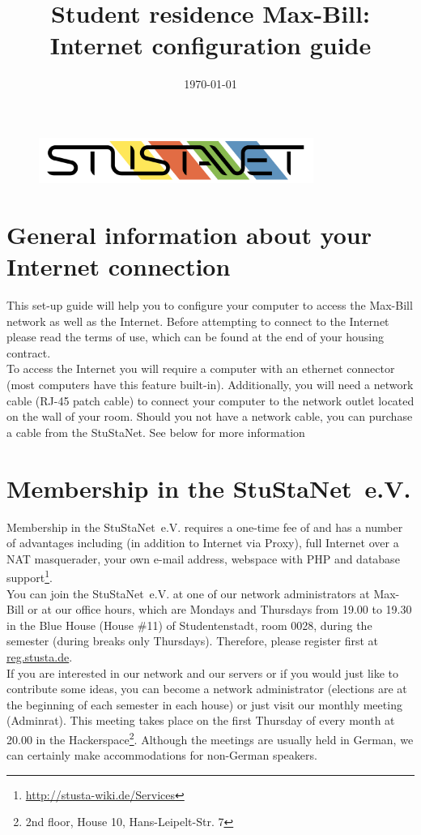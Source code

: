\documentclass[a4paper,12pt]{scrartcl}
\title{Student residence Max-Bill:\\
       Internet configuration guide}
\date{\today}
\begin{document}
\maketitle

\begin{figure}[t!]
   \centering
   \vspace{-20pt}
   \includegraphics[width=0.8\textwidth,keepaspectratio]{Bilder/StuStaNet_Logo}
   \vspace{-20pt}
\end{figure}

\section*{General information about your Internet connection}

This set-up guide will help you to configure your computer to access the Max-Bill network as well as the Internet. Before attempting to connect to the Internet please read the terms of use, which can be found at the end of your housing contract.
\\
To access the Internet you will require a computer with an ethernet connector (most computers have this feature built-in). Additionally, you will need a network cable (RJ-45 patch cable) to connect your computer to the network outlet located on the wall of your room. Should you not have a network cable, you can purchase a cable from the StuStaNet. See below for more information

\section*{Membership in the StuStaNet~e.V.}

Membership in the StuStaNet~e.V. requires a one-time fee of  and has a number of advantages including (in addition to Internet via Proxy), full Internet over a NAT masquerader, your own e-mail address, webspace with PHP and database support\footnote{\url{http://stusta-wiki.de/Services}}.
\\
You can join the StuStaNet~e.V. at one of our network administrators at Max-Bill or at our office hours, which are Mondays and Thursdays from 19.00 to 19.30 in the Blue House (House \#11) of Studentenstadt, room 0028, during the semester (during breaks only Thursdays). Therefore, please register first at \url{reg.stusta.de}.
\\
If you are interested in our network and our servers or if you would just like to contribute some ideas, you can become a network administrator (elections are at the beginning of each semester in each house) or just visit our monthly meeting (Adminrat). This meeting takes place on the first Thursday of every month at 20.00 in the Hackerspace\footnote{2nd floor, House 10, Hans-Leipelt-Str. 7}. Although the meetings are usually held in German, we can certainly make accommodations for non-German speakers.
\newpage
\end{document}
